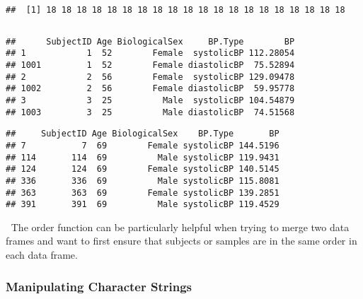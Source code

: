 \documentclass[
]{article}
\newenvironment{Shaded}{\begin{snugshade}}{\end{snugshade}}
\newcommand{\AttributeTok}[1]{\textcolor[rgb]{0.13,0.29,0.53}{#1}}
\newcommand{\CommentTok}[1]{\textcolor[rgb]{0.56,0.35,0.01}{\textit{#1}}}
\newcommand{\FunctionTok}[1]{\textcolor[rgb]{0.13,0.29,0.53}{\textbf{#1}}}
\newcommand{\NormalTok}[1]{#1}
\newcommand{\SpecialCharTok}[1]{\textcolor[rgb]{0.81,0.36,0.00}{\textbf{#1}}}
\begin{document}
\begin{verbatim}
##  [1] 18 18 18 18 18 18 18 18 18 18 18 18 18 18 18 18 18 18 18 18
\end{verbatim}

\(~\)

\begin{Shaded}
\end{Shaded}

\begin{verbatim}
##      SubjectID Age BiologicalSex     BP.Type        BP
## 1            1  52        Female  systolicBP 112.28054
## 1001         1  52        Female diastolicBP  75.52894
## 2            2  56        Female  systolicBP 129.09478
## 1002         2  56        Female diastolicBP  59.95778
## 3            3  25          Male  systolicBP 104.54879
## 1003         3  25          Male diastolicBP  74.51568
\end{verbatim}

\begin{Shaded}
\end{Shaded}

\begin{verbatim}
##     SubjectID Age BiologicalSex    BP.Type       BP
## 7           7  69        Female systolicBP 144.5196
## 114       114  69          Male systolicBP 119.9431
## 124       124  69        Female systolicBP 140.5145
## 336       336  69          Male systolicBP 115.8081
## 363       363  69        Female systolicBP 139.2851
## 391       391  69          Male systolicBP 119.4529
\end{verbatim}

\(~\) The order function can be particularly helpful when trying to
merge two data frames and want to first ensure that subjects or samples
are in the same order in each data frame.

\subsubsection{Manipulating Character
Strings}\label{manipulating-character-strings}
\end{document}
